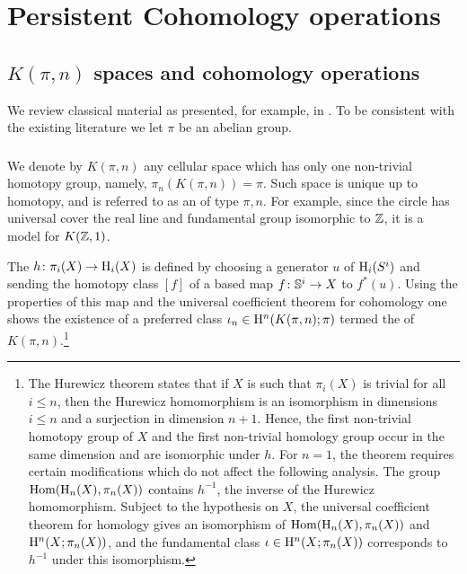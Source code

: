 
\section{Persistent Cohomology operations}\label{s:steenrod}

\subsection{$K(\pi, n)$ spaces and cohomology operations}

We review classical material as presented, for example, in \cite{mosheroperations1968}.
To be consistent with the existing literature we let $\pi$ be an abelian group.

\subsubsection{} We denote by $K(\pi, n)$ any cellular space which has only one non-trivial homotopy group, namely, $\pi_n(K(\pi, n)) = \pi$.
Such space is unique up to homotopy, and is referred to as an  of type $\pi,n$.
For example, since the circle has universal cover the real line and fundamental group isomorphic to $\mathbb{Z}$, it is a model for $K(\mathbb{Z},1)$.

The  $h \colon \pi_i(X) \rightarrow \mathrm{H}_i(X)$ is defined by choosing a generator $u$ of $\mathrm{H}_i(S^i)$ and sending the homotopy class $[f]$ of a based map $f \colon \mathbb{S}^i \to X$ to $f^*(u)$.
Using the properties of this map and the universal coefficient theorem for cohomology one shows the existence of a preferred class $\iota_n \in \mathrm{H}^n(K(\pi, n); \pi)$ termed the  of $K(\pi, n)$.\footnote{The Hurewicz theorem states that if $X$ is such that $\pi_i(X)$ is trivial for all $i \leq n$, then the Hurewicz homomorphism is an isomorphism in dimensions $i \leq n$ and a surjection in dimension $n+1$.
Hence, the first non-trivial homotopy group of $X$ and the first non-trivial homology group occur in the same dimension and are isomorphic under $h$.
For $n=1$, the theorem requires certain modifications which do not affect the following analysis.
The group $\mathrm{Hom}(\mathrm{H}_n(X), \pi_n(X))$ contains $h^{-1}$, the inverse of the Hurewicz homomorphism.
Subject to the hypothesis on $X$, the universal coefficient theorem for homology gives an isomorphism of $\mathrm{Hom}(\mathrm{H}_n(X), \pi_n(X))$ and $\mathrm{H}^n(X; \pi_n(X))$, and the fundamental class $\iota \in \mathrm{H}^n(X; \pi_n(X))$ corresponds to $h^{-1}$ under this isomorphism.}

